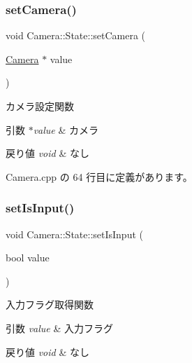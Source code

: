 \subsubsection{\texorpdfstring{set\+Camera()}{setCamera()}}
{\footnotesize\ttfamily void Camera\+::\+State\+::set\+Camera (\begin{DoxyParamCaption}\item[{\mbox{\hyperlink{class_camera}{Camera}} $\ast$}]{value }\end{DoxyParamCaption})}



カメラ設定関数 


\begin{DoxyParams}{引数}
{\em $\ast$value} & カメラ \\
\hline
\end{DoxyParams}

\begin{DoxyRetVals}{戻り値}
{\em void} & なし \\
\hline
\end{DoxyRetVals}


 Camera.\+cpp の 64 行目に定義があります。

\mbox{\label{class_camera_1_1_state_a29e30e611ec0fd1282e552a4304588bc}} 
\subsubsection{\texorpdfstring{set\+Is\+Input()}{setIsInput()}}
{\footnotesize\ttfamily void Camera\+::\+State\+::set\+Is\+Input (\begin{DoxyParamCaption}\item[{bool}]{value }\end{DoxyParamCaption})}



入力フラグ取得関数 


\begin{DoxyParams}{引数}
{\em value} & 入力フラグ \\
\hline
\end{DoxyParams}

\begin{DoxyRetVals}{戻り値}
{\em void} & なし \\
\hline
\end{DoxyRetVals}


